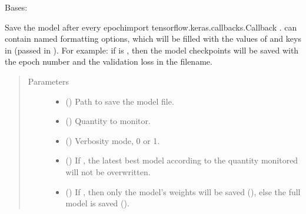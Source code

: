 \documentclass[letterpaper,10pt,english]{sphinxmanual}
\begin{document}
\begin{fulllineitems}
\label{\detokenize{utils/callbacks:utils.callbacks.ModelCheckpoint}}
Bases: 

Save the model after every epochimport tensorflow.keras.callbacks.Callback .
 can contain named formatting options,
which will be filled with the values of  and
keys in  (passed in ).
For example: if  is ,
then the model checkpoints will be saved with the epoch number and
the validation loss in the filename.
\begin{quote}\begin{description}
\item[{Parameters}] \leavevmode\begin{itemize}
\item {} 
 () \textendash{} Path to save the model file.

\item {} 
 () \textendash{} Quantity to monitor.

\item {} 
 () \textendash{} Verbosity mode, 0 or 1.

\item {} 
 () \textendash{} If , the latest best model according to the
quantity monitored will not be overwritten.

\item {} 
 () \textendash{} If , then only the model’s weights will be saved
(), else the full model is saved
().


\end{itemize}
\end{description}
\end{quote}
\end{fulllineitems}
\end{document}
